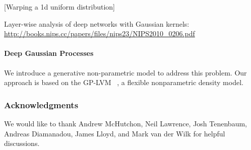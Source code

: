 \documentclass{article}
\begin{document}
[Warping a 1d uniform distribution]

Layer-wise analysis of deep networks with Gaussian
kernels:
\url{http://books.nips.cc/papers/files/nips23/NIPS2010_0206.pdf}

\paragraph{Deep Gaussian Processes}
We introduce a generative non-parametric model to address this problem.  Our approach is based on the GP-LVM ~\cite{lawrence2004gaussian,salzmann2008local,lawrence2009non}, a flexible nonparametric density model.





\subsubsection*{Acknowledgments}

We would like to thank Andrew McHutchon, Neil Lawrence, Josh Tenenbaum, Andreas Diamanadou, James Lloyd, and Mark van der Wilk for helpful discussions.



\end{document}
